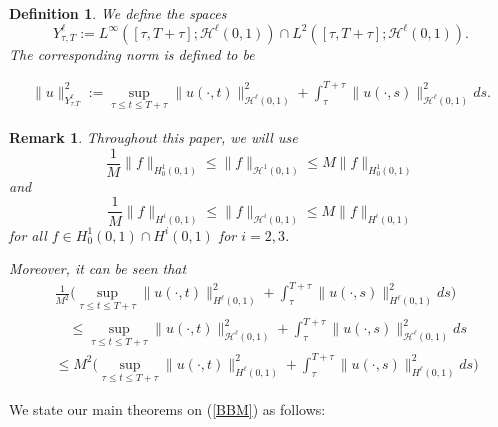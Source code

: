 \documentclass[10pt,a4paper,final]{article}
\numberwithin{equation}{section}
\newtheorem{definition}[theorem]{Definition}
\newtheorem{remark}[theorem]{Remark}
\newcommand{\cH}{\mathcal{H}}
\begin{document}
\begin{definition}
    We define the spaces 
    $$Y_{\tau,T}^\ell:=L^{\infty}([\tau,T+\tau]; \cH^\ell(0,1))\cap L^2([\tau,T+\tau]; \cH^\ell(0,1)).$$
    The corresponding norm is defined to be 
    
    \begin{align*}
        \|u\|_{Y^{\ell}_{\tau.T}}^2:=\sup_{\tau\leq t\leq T+\tau}\|u(\cdot,t)\|_{\cH^{\ell}(0,1)}^2+\int_{\tau}^{T+\tau}\|u(\cdot,s)\|_{\cH^{\ell}(0,1)}^2ds.
    \end{align*}
\end{definition}
\begin{remark}
    Throughout this paper, we will use
    $$\frac{1}{M}\|f\|_{H^1_0(0,1)}\leq \|f\|_{\cH^1(0,1)}\leq M\|f\|_{H^1_0(0,1)} $$
    and 
    $$\frac{1}{M}\|f\|_{H^i(0,1)}\leq \|f\|_{\cH^i(0,1)}\leq M\|f\|_{H^i(0,1)}$$
    for all $f\in H^1_0(0,1)\cap H^i(0,1)$ for $i=2,3$.

    Moreover, it can be seen that 
    \begin{align*}
        &\frac{1}{M^2}\bigg(\sup_{\tau\leq t\leq T+\tau}\|u(\cdot,t)\|_{H^{\ell}(0,1)}^2+\int_{\tau}^{T+\tau}\|u(\cdot,s)\|_{H^{\ell}(0,1)}^2ds\bigg)\\
        &\quad \leq \sup_{\tau\leq t\leq T+\tau}\|u(\cdot,t)\|_{\cH^{\ell}(0,1)}^2+\int_{\tau}^{T+\tau}\|u(\cdot,s)\|_{\cH^{\ell}(0,1)}^2ds\\
        &\leq M^2\bigg(\sup_{\tau\leq t\leq T+\tau}\|u(\cdot,t)\|_{H^{\ell}(0,1)}^2+\int_{\tau}^{T+\tau}\|u(\cdot,s)\|_{H^{\ell}(0,1)}^2ds\bigg)
    \end{align*}
\end{remark}

We state our main theorems on (\ref{BBM}) as follows:
\end{document}
